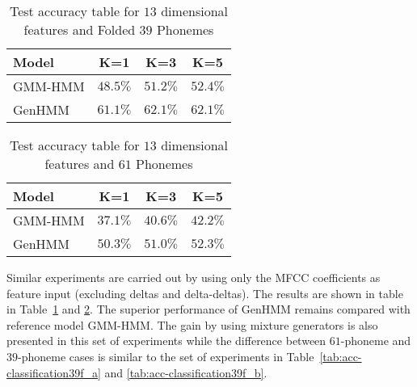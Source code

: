 \documentclass{ecai}
\begin{document}
\begin{table}
  \caption{Test accuracy table for $13$ dimensional features and Folded $39$ Phonemes}\label{tab:acc-classification13f_a}
  \centering  
  \begin{tabular}{l|c|c|c}
    \toprule
    {Model} &  K=1 &  K=3 &  K=5  \\  \midrule
    GMM-HMM & $48.5\%$ &  $51.2\%$ &  $52.4\%$  \\ \midrule
    GenHMM & $61.1\%$ & $62.1\%$ & $62.1\%$   \\ 
    \bottomrule                                                                  
  \end{tabular}
\end{table}
\begin{table}
  \caption{Test accuracy table for $13$ dimensional features and $61$
    Phonemes}\label{tab:acc-classification13f_b}
  \centering
  \begin{tabular}{l|c|c|c}
    \toprule
    {Model} &  K=1 &  K=3 &  K=5
    \\ \midrule
    GMM-HMM & $37.1\%$ &  $40.6\%$ & $42.2\%$  \\ \midrule
    GenHMM & $50.3\%$ & $51.0\%$ & $52.3\%$   \\ 
    \bottomrule
  \end{tabular}
\end{table}

Similar experiments are carried out by using only the MFCC coefficients as feature input (excluding deltas and delta-deltas). The results are shown in table in Table~\ref{tab:acc-classification13f_a} and \ref{tab:acc-classification13f_b}. The superior performance of GenHMM remains compared with reference model GMM-HMM. The gain by using mixture generators is also presented in this set of experiments while the difference between $61$-phoneme and $39$-phoneme cases is similar to the set of experiments in Table~\ref{tab:acc-classification39f_a} and \ref{tab:acc-classification39f_b}.
\end{document}
